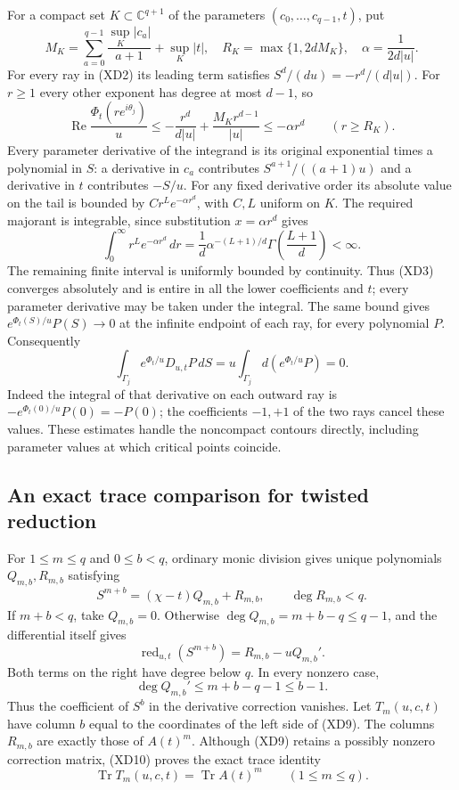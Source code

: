 For a compact set $K\subset\mathbb C^{q+1}$ of the parameters
$(c_0,\ldots,c_{q-1},t)$, put
\[
 M_K=\sum_{a=0}^{q-1}\frac{\sup_K|c_a|}{a+1}+\sup_K|t|,
 \quad R_K=\max\{1,2dM_K\},\quad\alpha=\frac1{2d|u|}.
 \tag{XD4}
\]
For every ray in (XD2) its leading term satisfies
$S^d/(du)=-r^d/(d|u|)$. For $r\geq1$ every other exponent
has degree at most $d-1$, so
\[
 \operatorname{Re}\frac{\Phi_t(re^{i\theta_j})}{u}
 \leq-\frac{r^d}{d|u|}+\frac{M_Kr^{d-1}}{|u|}
 \leq-\alpha r^d\qquad(r\geq R_K).
 \tag{XD5}
\]
Every parameter derivative of the integrand is its original exponential
times a polynomial in $S$: a derivative in $c_a$ contributes
$S^{a+1}/((a+1)u)$ and a derivative in $t$ contributes $-S/u$.
For any fixed derivative order its absolute value on the tail is
bounded by $Cr^L e^{-\alpha r^d}$, with $C,L$ uniform on $K$.
The required majorant is integrable, since substitution
$x=\alpha r^d$ gives
\[
 \int_0^\infty r^L e^{-\alpha r^d}\,dr
 =\frac1d\alpha^{-(L+1)/d}
    \Gamma\!\left(\frac{L+1}{d}\right)<\infty.
 \tag{XD6}
\]
The remaining finite interval is uniformly bounded by continuity.
Thus (XD3) converges absolutely and is entire in all the lower
coefficients and $t$; every parameter derivative may be taken under
the integral. The same bound gives
$e^{\Phi_t(S)/u}P(S)\longrightarrow0$ at the infinite endpoint
of each ray, for every polynomial $P$. Consequently
\[
 \int_{\Gamma_j}e^{\Phi_t/u}D_{u,t}P\,dS
 =u\int_{\Gamma_j}d(e^{\Phi_t/u}P)=0.
 \tag{XD7}
\]
Indeed the integral of that derivative on each outward ray is
$-e^{\Phi_t(0)/u}P(0)=-P(0)$; the coefficients $-1,+1$ of
the two rays cancel these values. These estimates handle the
noncompact contours directly, including parameter values at which
critical points coincide.

\subsection{An exact trace comparison for twisted reduction}

For $1\leq m\leq q$ and $0\leq b<q$, ordinary monic division gives
unique polynomials $Q_{m,b},R_{m,b}$ satisfying
\[
 S^{m+b}=(\chi-t)Q_{m,b}+R_{m,b},\qquad
 \deg R_{m,b}<q.
 \tag{XD8}
\]
If $m+b<q$, take $Q_{m,b}=0$. Otherwise
$\deg Q_{m,b}=m+b-q\leq q-1$, and the differential itself gives
\[
 \operatorname{red}_{u,t}(S^{m+b})
   =R_{m,b}-uQ_{m,b}'.
 \tag{XD9}
\]
Both terms on the right have degree below $q$. In every nonzero
case,
\[
 \deg Q_{m,b}'\leq m+b-q-1\leq b-1.
 \tag{XD10}
\]
Thus the coefficient of $S^b$ in the derivative correction vanishes.
Let $T_m(u,c,t)$ have column $b$ equal to the coordinates of the
left side of (XD9). The columns $R_{m,b}$ are exactly those of
$A(t)^m$. Although (XD9) retains a possibly nonzero correction
matrix, (XD10) proves the exact trace identity
\[
 \operatorname{Tr}T_m(u,c,t)=\operatorname{Tr}A(t)^m
       \qquad(1\leq m\leq q).
 \tag{XD11}
\]

